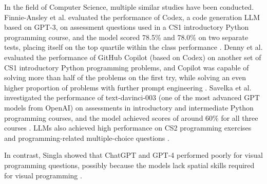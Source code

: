 \documentclass[sigconf,review]{acmart}
\begin{document}
In the field of Computer Science, multiple similar studies have been conducted. Finnie-Ansley et al. evaluated the performance of Codex, a code generation LLM based on GPT-3, on assessment questions used in a CS1 introductory Python programming course, and the model scored 78.5\% and 78.0\% on two separate tests, placing itself on the top quartile within the class performance \cite{testcodex}. Denny et al. evaluated the performance of GitHub Copilot (based on Codex) on another set of CS1 introductory Python programming problems, and Copilot was capable of solving more than half of the problems on the first try, while solving an even higher proportion of problems with further prompt engineering \cite{testcopilot}. Savelka et al. investigated the performance of text-davinci-003 (one of the most advanced GPT models from OpenAI) on assessments in introductory and intermediate Python programming courses, and the model achieved scores of around 60\% for all three courses \cite{testgpt}. LLMs also achieved high performance on CS2 programming exercises \cite{testcs2} and programming-related multiple-choice questions \cite{testhigher}.

In contrast, Singla showed that ChatGPT and GPT-4 performed poorly for visual programming questions, possibly because the models lack spatial skills required for visual programming \cite{testvisual}.

\end{document}
